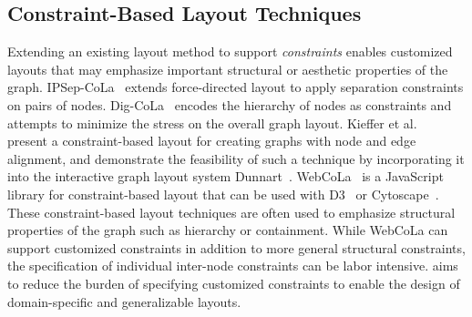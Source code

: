 \subsection{Constraint-Based Layout Techniques}
Extending an existing layout method to support \emph{constraints} enables customized layouts that may emphasize important
structural or aesthetic properties of the graph. IPSep-CoLa~\cite{dwyer2006ipsep} extends
force-directed layout to apply separation constraints on pairs of nodes.
Dig-CoLa~\cite{dwyer2005dig} encodes the hierarchy of nodes as constraints
and attempts to minimize the stress on the overall graph layout. 
Kieffer et al.~\cite{kieffer2013incremental} present a constraint-based 
layout for creating graphs with node and edge alignment,
and demonstrate the feasibility of such a technique by incorporating it into
the interactive graph layout system Dunnart~\cite{dwyer2008dunnart}.
WebCoLa~\cite{WebCoLa} is a JavaScript library for constraint-based layout 
that can be used with D3~\cite{bostock:d3} or Cytoscape~\cite{shannon2003cytoscape}. 
These constraint-based layout techniques are often used to emphasize structural properties of
the graph such as hierarchy or containment. While WebCoLa can support 
customized constraints in addition to more general structural constraints,
the specification of individual inter-node constraints can be labor intensive.
\projectname aims to reduce the burden of specifying customized constraints
to enable the design of domain-specific and generalizable layouts.



